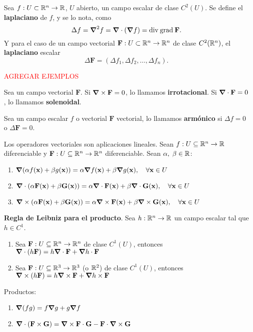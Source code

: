 \begin{definition}
    Sea $f:U\subset\mathbb{R}^n\to\mathbb{R}$, $U$ abierto, un campo escalar de clase $C^2(U)$. Se define el \textbf{laplaciano} de $f$, y se lo nota, como
    \[
        \Delta f=\grad^2f=\grad\cdot(\grad f)=\text{div}\:\text{grad}\:\mathbf{F}.  
    \]
    Y para el caso de un campo vectorial $\mathbf{F}:U\subset\mathbb{R}^n\to\mathbb{R}^n$ de clase $C^2(\mathbb{R}^n)$, el \textbf{laplaciano} escalar
    \[
        \Delta\mathbf{F}=(\Delta f_1,\Delta f_2,\ldots,\Delta f_n). 
    \]
\end{definition}

\textcolor{red}{AGREGAR EJEMPLOS}

\begin{definition}
    Sea un campo vectorial $\mathbf{F}$. Si $\grad\times\mathbf{F}=0$, lo llamamos \textbf{irrotacional}. Si $\grad\cdot\mathbf{F}=0$, lo llamamos \textbf{solenoidal}.
\end{definition}
\begin{definition}
    Sea un campo escalar $f$ o vectorial $\mathbf{F}$ vectorial, lo llamamos \textbf{arm\'onico} si $\Delta f=0$ o $\Delta \mathbf{F}=0$.
\end{definition}
\begin{propertie}
    Los operadores vectoriales son aplicaciones lineales. Sean $f:U\subseteq\mathbb{R}^n\to\mathbb{R}$ diferenciable y $\mathbf{F}:U\subseteq\mathbb{R}^n\to\mathbb{R}^n$ diferenciable. Sean $\alpha,\;\beta\in\mathbb{R}$:
    \begin{enumerate}
        \item \(\grad(\alpha f(\mathbf{x})+\beta g(\mathbf{x}))=\alpha\grad f(\mathbf{x})+\beta\grad g(\mathbf{x}),\quad\forall\mathbf{x}\in U\)
        \item \(\grad\cdot(\alpha \mathbf{F}(\mathbf{x})+\beta \mathbf{G}(\mathbf{x}))=\alpha\grad\cdot\mathbf{F}(\mathbf{x})+\beta\grad\cdot\mathbf{G}(\mathbf{x}),\quad\forall\mathbf{x}\in U\)
        \item \(\grad\times(\alpha \mathbf{F}(\mathbf{x})+\beta \mathbf{G}(\mathbf{x}))=\alpha\grad\times\mathbf{F}(\mathbf{x})+\beta\grad\times\mathbf{G}(\mathbf{x}),\quad\forall\mathbf{x}\in U\)
    \end{enumerate}
\end{propertie}
\begin{propertie}
    \textbf{Regla de Leibniz para el producto}. Sea $h:\mathbb{R}^n\to\mathbb{R}$ un campo escalar tal que $h\in C^1$.
    \begin{enumerate}
        \item Sea $\mathbf{F}:U\subseteq\mathbb{R}^n\to\mathbb{R}^n$ de clase $C^1(U)$, entonces $\grad\cdot(h\mathbf{F})=h\grad\cdot\mathbf{F}+\grad h\cdot\mathbf{F}$
        \item Sea $\mathbf{F}:U\subseteq\mathbb{R}^3\to\mathbb{R}^3$ (o $\mathbb{R}^2$) de clase $C^1(U)$, entonces $\grad\times(h\mathbf{F})=h\grad\times\mathbf{F}+\grad h\times\mathbf{F}$
    \end{enumerate}
\end{propertie}
\begin{propertie}
    Productos:
    \begin{enumerate}
        \item $\grad(fg)=f\grad g+g\grad f$
        \item $\grad\cdot(\mathbf{F}\times\mathbf{G})=\grad\times\mathbf{F}\cdot\mathbf{G}-\mathbf{F}\cdot\grad\times\mathbf{G}$
    \end{enumerate}
\end{propertie}